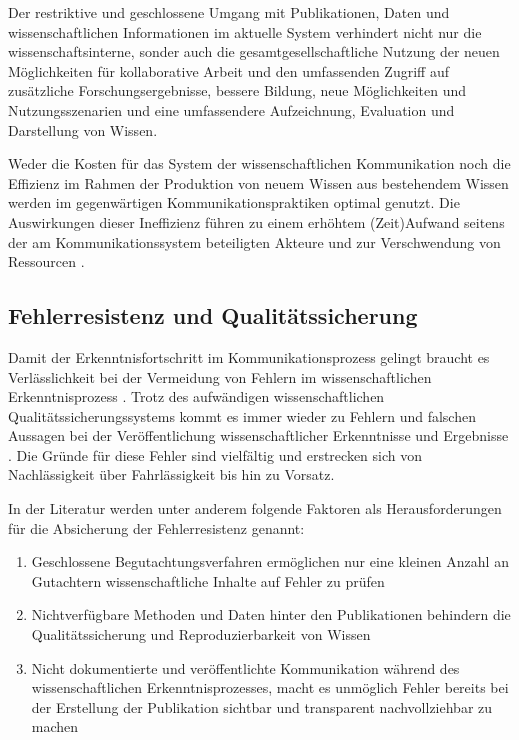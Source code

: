 Der restriktive und geschlossene Umgang mit Publikationen, Daten und wissenschaftlichen Informationen im aktuelle System verhindert nicht nur die wissenschaftsinterne, sonder auch die gesamtgesellschaftliche Nutzung der neuen Möglichkeiten für kollaborative Arbeit und den umfassenden Zugriff auf zusätzliche Forschungsergebnisse, bessere Bildung, neue Möglichkeiten und Nutzungsszenarien und eine umfassendere Aufzeichnung, Evaluation und Darstellung von Wissen.

Weder die Kosten für das System der wissenschaftlichen Kommunikation noch die Effizienz im Rahmen der Produktion von neuem Wissen aus bestehendem Wissen werden im gegenwärtigen Kommunikationspraktiken optimal genutzt. Die Auswirkungen dieser Ineffizienz führen zu einem erhöhtem (Zeit)Aufwand seitens der am Kommunikationssystem beteiligten Akteure und zur Verschwendung von Ressourcen \cite{Nosek_2012}.

\subsection{Fehlerresistenz und Qualitätssicherung}

Damit der Erkenntnisfortschritt im Kommunikationsprozess gelingt braucht es Verlässlichkeit bei der Vermeidung von Fehlern im wissenschaftlichen Erkenntnisprozess \cite{Bargheer_2015}. Trotz des aufwändigen wissenschaftlichen Qualitätssicherungssystems kommt es immer wieder zu Fehlern und falschen Aussagen bei der Veröffentlichung wissenschaftlicher Erkenntnisse und Ergebnisse \cite{Brembs_2015} \cite{Luescher_2014} \cite{Smith_2006}. Die Gründe für diese Fehler sind vielfältig und erstrecken sich von Nachlässigkeit über Fahrlässigkeit bis hin zu Vorsatz.

In der Literatur werden unter anderem folgende Faktoren als Herausforderungen für die Absicherung der Fehlerresistenz genannt:
\begin{enumerate}
\item Geschlossene Begutachtungsverfahren ermöglichen nur eine kleinen Anzahl an Gutachtern wissenschaftliche Inhalte auf Fehler zu prüfen \cite{Smith_2006}
\item Nichtverfügbare Methoden und Daten hinter den Publikationen behindern die Qualitätssicherung und Reproduzierbarkeit von Wissen \cite{Nosek_2015} \cite[:9]{Gruber_2005}
\item Nicht dokumentierte und veröffentlichte Kommunikation während des wissenschaftlichen Erkenntnisprozesses, macht es unmöglich Fehler bereits bei der Erstellung der Publikation sichtbar und transparent nachvollziehbar zu machen \cite{Nosek_2015}
\end{enumerate}

